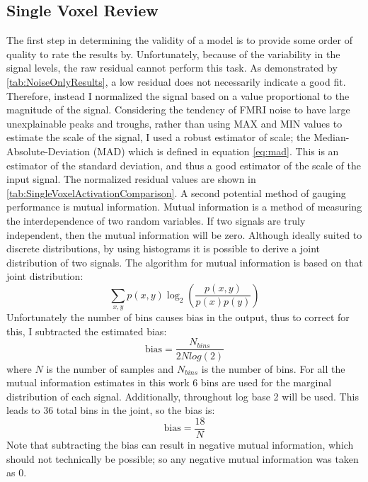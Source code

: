 \subsection{Single Voxel Review}
\label{sec:SingleVoxelReview}
The first step in determining the validity of a model is to provide some order of quality
to rate the results by. Unfortunately, because of the variability in the signal levels, the
raw residual cannot perform this task. As demonstrated by \autoref{tab:NoiseOnlyResults},
a low residual does not necessarily indicate a good fit. 
Therefore, instead I  normalized the signal based on a value proportional to
the magnitude of the signal. Considering the tendency of FMRI noise to have large unexplainable
peaks and troughs, rather than using MAX and MIN values to estimate the scale of the 
signal, I used a robust estimator of 
scale; the Median-Absolute-Deviation (MAD) which is defined in equation \autoref{eq:mad}.
This is an estimator of the standard
deviation, and thus a good estimator of the scale of the input signal. 
The normalized residual values are 
shown in \autoref{tab:SingleVoxelActivationComparison}. A second potential method of 
gauging performance is mutual information. Mutual information is a method of measuring
the interdependence of two random variables. If two signals are truly independent,
then the mutual information will be zero. Although ideally suited to discrete
distributions, by using histograms
it is possible to derive a joint distribution of two signals. The algorithm for 
mutual information is based on that joint distribution:
\begin{equation}
\sum_{x,y} p(x,y) \log_2\left(\frac{p(x,y)}{p(x)p(y)}\right)
\end{equation}
Unfortunately the number of bins causes bias in the output, thus to correct for this,
I subtracted the estimated bias:
\begin{equation}
\text{bias} = \frac{N_{bins}}{2Nlog(2)}
\end{equation}
where $N$ is the number of samples and $N_{bins}$ is the number of bins. For all
the mutual information estimates in this work 6 bins are used for the marginal
distribution of each signal. Additionally, throughout log base 2 will be used.
This leads to 36 total bins in the joint, so the bias is: 
\begin{equation}
\text{bias} = \frac{18}{N}
\end{equation}
 Note that subtracting the bias can result in negative mutual
information, which should not technically be possible; so any negative mutual information
was taken as 0.

